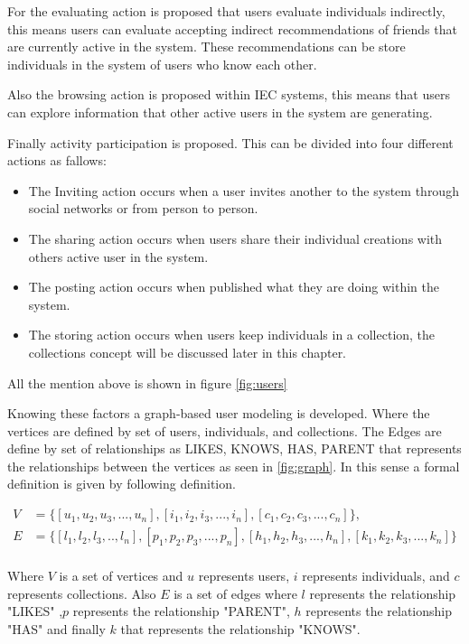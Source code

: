 For the evaluating action is proposed  that users evaluate individuals
indirectly, this means users can evaluate accepting indirect recommendations of
friends that are currently active in the system. These recommendations can be
store individuals in the system of users who know each other.

Also the  browsing action is proposed within IEC systems,  this means that users
can explore information that other active users in the system are generating.

Finally activity participation is proposed. This can be divided into four
different actions as fallows:

\begin{itemize} 
\item The Inviting action occurs when a user invites another to the system through social networks or from person to person.  
\item The sharing action occurs when users share their individual creations with others active user in the system.
\item The posting action occurs when published what they are doing within the system.
\item The storing action occurs when users keep individuals in a collection, the collections concept will be discussed later in this chapter.
\end{itemize}

All the mention above is shown in figure \ref{fig:users}


Knowing these factors a graph-based user modeling is developed. Where the vertices are defined by set of users, individuals, and
collections. The Edges are define by set of relationships as LIKES, KNOWS, HAS, PARENT that represents the relationships between the vertices as seen in \ref{fig:graph}. In this sense a formal definition is given by following definition.


\begin{equation*}\label{eq:graphRelDef} 
\displaystyle 
\begin{split} 
V &= \{[u_1,u_2,u_3,...,u_n],[i_1,i_2,i_3,...,i_n],[c_1,c_2,c_3,...,c_n]\},\\ 
E&= \{[l_1,l_2,l_3,..,l_n],[p_1,p_2,p_3,...,p_n],[h_1,h_2,h_3,...,h_n],[k_1,k_2,k_3,...,k_n]\}\\ 
\end{split} 
\end{equation*} 

Where $V$ is a set of vertices and $u$ represents users, $i$ represents
individuals, and $c$ represents collections. Also $E$ is a set of edges where
$l$ represents the relationship "LIKES" ,$p$ represents the relationship
"PARENT", $h$ represents the relationship "HAS" and finally $k$ that represents
the relationship "KNOWS".

